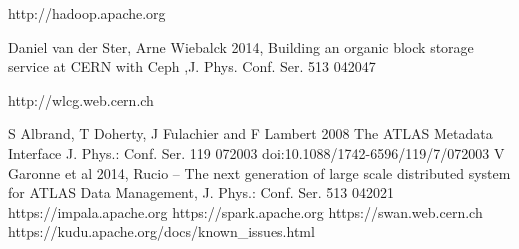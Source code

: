 \documentclass{webofc}
\begin{document}
\begin{linenumbers}
\begin{thebibliography}{}
{http://hadoop.apache.org}

Daniel van der Ster, Arne Wiebalck 2014, Building an organic block storage service at CERN
with Ceph ,J. Phys. Conf. Ser. 513 042047


{http://wlcg.web.cern.ch}

S Albrand, T Doherty, J Fulachier and F Lambert 2008 The ATLAS Metadata Interface J. Phys.:
Conf. Ser. 119 072003 doi:10.1088/1742-6596/119/7/072003
 V Garonne et al 2014, Rucio – The next generation of large scale
distributed system for ATLAS Data Management, J. Phys.: Conf. Ser. 513 042021
{https://impala.apache.org}
{https://spark.apache.org}
{https://swan.web.cern.ch}
{https://kudu.apache.org/docs/known\_issues.html}


\end{thebibliography}
\end{linenumbers}
\end{document}
